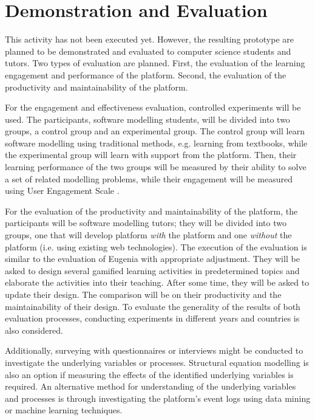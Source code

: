 \documentclass[12pt, a4paper]{report} \usepackage[titletoc]{appendix}
\begin{document}
\section{Demonstration and Evaluation}
This activity has not been executed yet. However, the resulting prototype are planned to be demonstrated and evaluated to computer science students and tutors. Two types of evaluation are planned. First, the evaluation of the learning engagement and performance of the platform. Second, the evaluation of the productivity and maintainability of the platform.

For the engagement and effectiveness evaluation, controlled experiments will be used. The participants, software modelling students, will be divided into two groups, a control group and an experimental group. The control group will learn software modelling using traditional methods, e.g. learning from textbooks, while the experimental group will learn with support from the platform. Then, their learning performance of the two groups will be measured by their ability to solve a set of related modelling problems, while their engagement will be measured using User Engagement Scale \cite{wiebe2014measuring}.  

For the evaluation of the productivity and maintainability of the platform, the participants will be software modelling tutors; they will be divided into two groups, one that will develop platform \emph{with} the platform and one \emph{without} the platform (i.e. using existing web technologies). The execution of the evaluation is similar to the evaluation of Eugenia \cite{kolovos2015eugenia} with appropriate adjustment. They will be asked to design several gamified learning activities in predetermined topics and elaborate the activities into their teaching. After some time, they will be asked to update their  design. The comparison will be on their productivity and the maintainability of their design. To evaluate the generality of the results of both evaluation processes, conducting experiments in different years and countries is also considered.

Additionally, surveying with questionnaires or interviews might be conducted to investigate the underlying variables or processes. Structural equation modelling \cite{hair2016primer} is also an option if measuring the effects of the identified underlying variables is required. An alternative method for understanding of the underlying variables and processes is through investigating the platform's event logs using data mining or machine learning techniques. 
\end{document}
